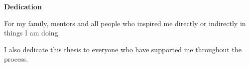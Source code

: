 
\newpage
\vspace*{0.9cm}
\begin{center}
{\bf \Huge Dedication}
\end{center}

\setlength{\baselineskip}{0.8cm}



For my family, mentors and all people who inspired me directly or indirectly in things I am doing.

I also dedicate this thesis to everyone who have supported me throughout the process.
